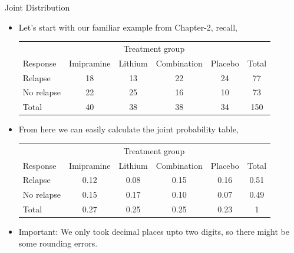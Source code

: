 \documentclass[8pt, usepdftitle=false]{beamer}
\begin{document}
\begin{frame}{Joint Distribution}




\begin{itemize}

\item Let's start with our familiar example from Chapter-2, recall, 


\begin{table}
\centering
  \begin{tabular}{|lccccc|}
\hline & \multicolumn{4}{c}{ Treatment group } & \\
\cline { 2 - 6 } Response & Imipramine & Lithium & Combination & Placebo & Total \\
\hline Relapse & 18 & 13 & 22 & 24 & 77 \\
No relapse & 22 & 25 & 16 & 10 & 73 \\
\hline Total & 40 & 38 & 38 & 34 & 150 \\
\hline
\end{tabular}
\end{table}


\item From here we can easily calculate the joint probability table, 


\begin{table}
\centering
  \begin{tabular}{|lcccc|c|}
\hline & \multicolumn{4}{c}{ Treatment group } & \\
\cline { 2 - 6 } Response & Imipramine & Lithium & Combination & Placebo & Total \\
\hline Relapse & 0.12 & 0.08 & 0.15 & 0.16 & 0.51 \\
No relapse & 0.15 & 0.17 & 0.10 & 0.07 & 0.49 \\
\hline Total & 0.27 & 0.25 & 0.25 & 0.23 & 1 \\
\hline
\end{tabular}
\end{table}

\item Important: We only took decimal places upto two digits, so there might be some rounding errors.



  
\end{itemize}


\end{frame}
\end{document}
